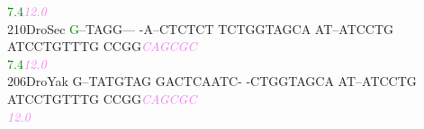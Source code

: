 \documentclass[11pt,twoside,reqno,a4paper]{article}
\begin{document}
{\hspace*{4\charwidth}\hspace*{7\charwidth}\hspace*{0\charwidth}\textcolor{green}{7.4}\hspace*{1\charwidth}\hspace*{1\charwidth}\hspace*{1\charwidth}\hspace*{1\charwidth}\hspace*{1\charwidth}\hspace*{51\charwidth}\textit{\textcolor{violet}{12.0}}\hspace*{1\charwidth}\\
210\hspace*{1\charwidth}DroSec	\textcolor{green}{G}--TAGG---	-A--CTCTCT	TCTGGTAGCA	AT--ATCCTG	ATCCTGTTTG	CCGG\textit{\textcolor{violet}{C}}\textit{\textcolor{violet}{A}}\textit{\textcolor{violet}{G}}\textit{\textcolor{violet}{C}}\textit{\textcolor{violet}{G}}\textit{\textcolor{violet}{C}}	\\
\hspace*{4\charwidth}\hspace*{7\charwidth}\hspace*{0\charwidth}\textcolor{green}{7.4}\hspace*{1\charwidth}\hspace*{1\charwidth}\hspace*{1\charwidth}\hspace*{1\charwidth}\hspace*{1\charwidth}\hspace*{51\charwidth}\textit{\textcolor{violet}{12.0}}\hspace*{1\charwidth}\\
206\hspace*{1\charwidth}DroYak	G--TATGTAG	GACTCAATC-	-CTGGTAGCA	AT--ATCCTG	ATCCTGTTTG	CCGG\textit{\textcolor{violet}{C}}\textit{\textcolor{violet}{A}}\textit{\textcolor{violet}{G}}\textit{\textcolor{violet}{C}}\textit{\textcolor{violet}{G}}\textit{\textcolor{violet}{C}}	\\
\hspace*{4\charwidth}\hspace*{7\charwidth}\hspace*{1\charwidth}\hspace*{1\charwidth}\hspace*{1\charwidth}\hspace*{1\charwidth}\hspace*{1\charwidth}\hspace*{54\charwidth}\textit{\textcolor{violet}{12.0}}\hspace*{1\charwidth}\\
}
\end{document}
